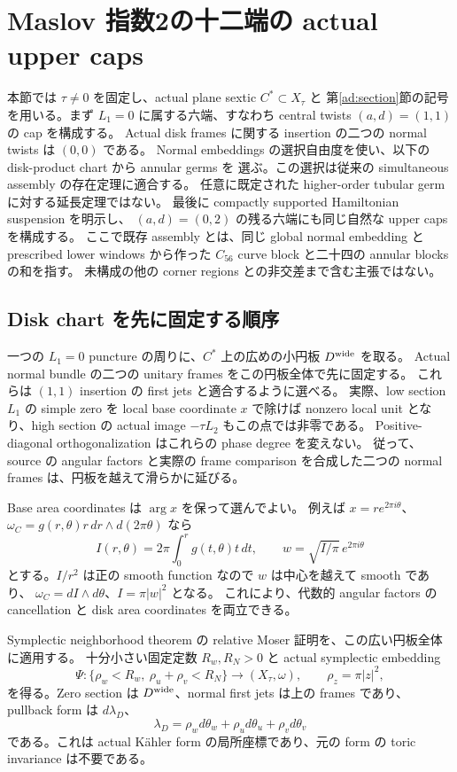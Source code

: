 \section{Maslov 指数2の十二端の actual upper caps}
\label{kc:section}

本節では $\tau\ne0$ を固定し、actual plane sextic $C^*\subset X_\tau$ と
第\ref{ad:section}節の記号を用いる。まず $L_1=0$ に属する六端、すなわち
central twists $(a,d)=(1,1)$ の cap を構成する。
Actual disk frames に関する insertion の二つの normal twists は $(0,0)$ である。
Normal embeddings の選択自由度を使い、以下の disk-product chart から annular germs を
選ぶ。この選択は従来の simultaneous assembly の存在定理に適合する。
任意に既定された higher-order tubular germ に対する延長定理ではない。
最後に compactly supported Hamiltonian suspension を明示し、
$(a,d)=(0,2)$ の残る六端にも同じ自然な upper caps を構成する。
ここで既存 assembly とは、同じ global normal embedding と prescribed lower windows から作った
$C_{56}$ curve block と二十四の annular blocks の和を指す。
未構成の他の corner regions との非交差まで含む主張ではない。

\subsection{Disk chart を先に固定する順序}

一つの $L_1=0$ puncture の周りに、$C^*$ 上の広めの小円板 $D^{\rm wide}$ を取る。
Actual normal bundle の二つの unitary frames をこの円板全体で先に固定する。
これらは $(1,1)$ insertion の first jets と適合するように選べる。
実際、low section $L_1$ の simple zero を local base coordinate $x$ で除けば
nonzero local unit となり、high section の actual image $-\tau L_2$ もこの点では非零である。
Positive-diagonal orthogonalization はこれらの phase degree を変えない。
従って、source の angular factors と実際の frame comparison を合成した二つの
normal frames は、円板を越えて滑らかに延びる。

Base area coordinates は $\arg x$ を保って選んでよい。
例えば $x=re^{2\pi i\theta}$、
$\omega_C=g(r,\theta)r\,dr\wedge d(2\pi\theta)$ なら
\[
 I(r,\theta)=2\pi\int_0^r g(t,\theta)t\,dt,
 \qquad w=\sqrt{I/\pi}\,e^{2\pi i\theta}
\]
とする。$I/r^2$ は正の smooth function なので $w$ は中心を越えて smooth であり、
$\omega_C=dI\wedge d\theta$、$I=\pi|w|^2$ となる。
これにより、代数的 angular factors の cancellation と disk area coordinates を両立できる。

Symplectic neighborhood theorem の relative Moser 証明を、この広い円板全体に適用する。
十分小さい固定定数 $R_w,R_N>0$ と actual symplectic embedding
\begin{equation}\label{kc:wide-chart}
 \Psi:\{\rho_w<R_w,\ \rho_u+\rho_v<R_N\}\longrightarrow(X_\tau,\omega),
 \qquad \rho_z=\pi|z|^2,
\end{equation}
を得る。Zero section は $D^{\rm wide}$、normal first jets は上の frames であり、
pullback form は $d\lambda_D$、
\[
 \lambda_D=\rho_wd\theta_w+\rho_ud\theta_u+\rho_vd\theta_v
\]
である。これは actual K\"ahler form の局所座標であり、元の form の toric invariance は不要である。

